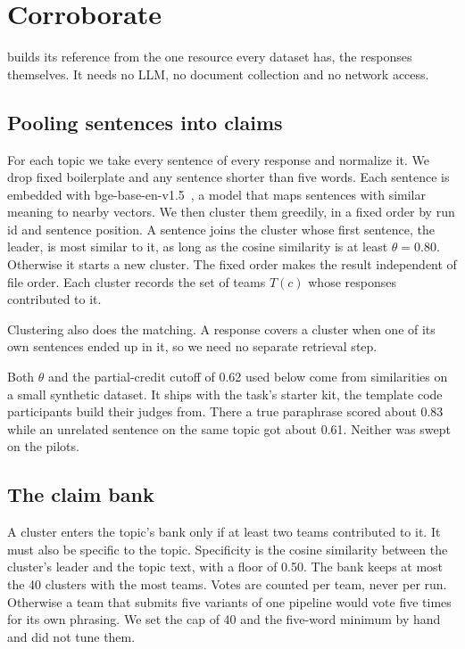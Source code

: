 \section{Corroborate}
\label{sec:corroborate}

 builds its reference from the one resource every dataset has,
the responses themselves. It needs no LLM, no document collection and no network
access.

\subsection{Pooling sentences into claims}

For each topic we take every sentence of every response and normalize it. We drop
fixed boilerplate and any sentence shorter than five words. Each sentence is
embedded with bge-base-en-v1.5~\cite{xiao2023cpack}, a model that maps sentences
with similar meaning to nearby vectors. We then cluster them greedily, in a fixed
order by run id and sentence position. A sentence joins the cluster whose first
sentence, the leader, is most similar to it, as long as the cosine similarity is at
least $\theta=0.80$. Otherwise it starts a new cluster. The fixed order makes the
result independent of file order. Each cluster records the set of teams $T(c)$
whose responses contributed to it.

Clustering also does the matching. A response covers a cluster when one of its own
sentences ended up in it, so we need no separate retrieval step.

Both $\theta$ and the partial-credit cutoff of 0.62 used below come from similarities on a small synthetic dataset. It ships with the task's starter kit, the template code participants build their judges from. There a true paraphrase scored about 0.83
while an unrelated sentence on the same topic got about 0.61. Neither was swept on
the pilots.

\subsection{The claim bank}

A cluster enters the topic's bank only if at least two teams contributed to it. It
must also be specific to the topic. Specificity is the cosine similarity between
the cluster's leader and the topic text, with a floor of 0.50. The bank keeps at
most the 40 clusters with the most teams. Votes are counted per team, never per
run. Otherwise a team that submits five variants of one pipeline would
vote five times for its own phrasing. We set the cap of 40 and the five-word
minimum by hand and did not tune them.

